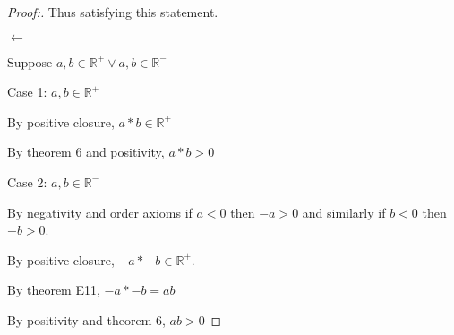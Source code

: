 \documentclass[12pt]{article}
\begin{document}
\begin{proof}[Proof:]
    Thus satisfying this statement.

    \textbf{$\longleftarrow$}

    Suppose $a, b \in \mathbb{R^+} \lor a, b \in \mathbb{R^-}$

    Case 1: $a, b \in \mathbb{R^+}$

    By positive closure, $a * b \in \mathbb{R^+}$

    By theorem 6 and positivity, $a * b > 0$

    \newpage

    Case 2: $a, b \in \mathbb{R^-}$

    By negativity and order axioms if $a < 0$ then $-a > 0$ and similarly if $b < 0$ then $-b > 0$.

    By positive closure, $-a * -b \in \mathbb{R^+}$.

    By theorem E11, $-a * -b = ab$

    By positivity and theorem 6, $ab > 0$

\end{proof}
\end{document}
